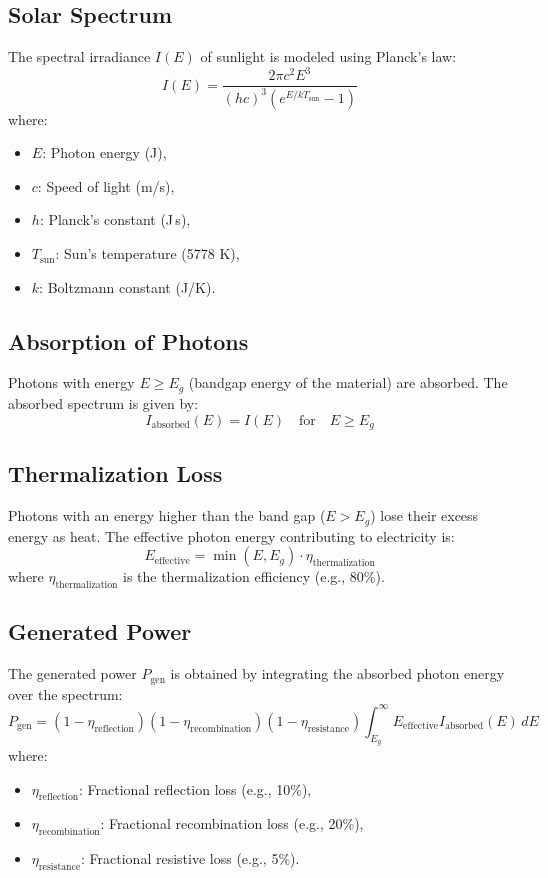 \documentclass[11pt]{article}
\begin{document}
\subsection{Solar Spectrum}
The spectral irradiance $I(E)$ of sunlight is modeled using Planck's law:
\begin{equation}
I(E) = \frac{2 \pi c^2 E^3}{(hc)^3 \left(e^{E / kT_{\text{sun}}} - 1\right)}
\end{equation}
where:
\begin{itemize}
    \item $E$: Photon energy (J),
    \item $c$: Speed of light (m/s),
    \item $h$: Planck's constant (J\,s),
    \item $T_{\text{sun}}$: Sun's temperature (5778 K),
    \item $k$: Boltzmann constant (J/K).
\end{itemize}

\subsection{Absorption of Photons}
Photons with energy $E \geq E_g$ (bandgap energy of the material) are absorbed. The absorbed spectrum is given by:
\begin{equation}
I_{\text{absorbed}}(E) = I(E) \quad \text{for} \quad E \geq E_g
\end{equation}

\subsection{Thermalization Loss}
Photons with an energy higher than the band gap ($E > E_g$) lose their excess energy as heat. The effective photon energy contributing to electricity is:
\begin{equation}
E_{\text{effective}} = \min(E, E_g) \cdot \eta_{\text{thermalization}}
\end{equation}
where $\eta_{\text{thermalization}}$ is the thermalization efficiency (e.g., 80\%).

\subsection{Generated Power}
The generated power $P_{\text{gen}}$ is obtained by integrating the absorbed photon energy over the spectrum:
\begin{equation}
P_{\text{gen}} = (1 - \eta_{\text{reflection}})(1 - \eta_{\text{recombination}})(1 - \eta_{\text{resistance}}) \int_{E_g}^\infty E_{\text{effective}} I_{\text{absorbed}}(E) \, dE
\end{equation}
where:
\begin{itemize}
    \item $\eta_{\text{reflection}}$: Fractional reflection loss (e.g., 10\%),
    \item $\eta_{\text{recombination}}$: Fractional recombination loss (e.g., 20\%),
    \item $\eta_{\text{resistance}}$: Fractional resistive loss (e.g., 5\%).
\end{itemize}
\end{document}
